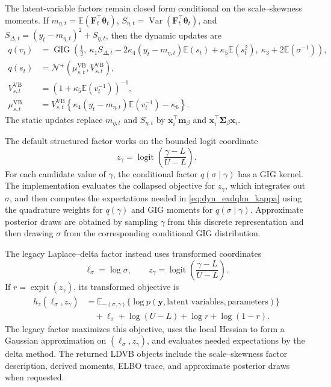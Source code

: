 \documentclass{jss}
\newcommand{\vect}[1]{\boldsymbol{#1}}
\newcommand{\mat}[1]{\mathbf{#1}}
\renewcommand{\E}{\mathbb{E}}
\newcommand{\Var}{\operatorname{Var}}
\newcommand{\logit}{\operatorname{logit}}
\newcommand{\expit}{\operatorname{expit}}
\newcommand{\TNp}{\mathcal{N}^{+}}
\newcommand{\GIG}{\operatorname{GIG}}
\begin{document}
The latent-variable factors remain closed form conditional on the
scale--skewness moments. If $m_{\eta,t}=\E(\mat{F}_t^\top\vect{\theta}_t)$,
$S_{\eta,t}=\Var(\mat{F}_t^\top\vect{\theta}_t)$, and
$S_{\Delta,t}=(y_t-m_{\eta,t})^2+S_{\eta,t}$, then the dynamic updates are
\begin{align}
q(v_t)&=\GIG\left(
\frac{1}{2},\
\kappa_1S_{\Delta,t}-2\kappa_4(y_t-m_{\eta,t})\E(s_t)
+\kappa_5\E(s_t^2),\
\kappa_3+2\E(\sigma^{-1})
\right),\\
q(s_t)&=\TNp(\mu_{s,t}^{\mathrm{VB}},V_{s,t}^{\mathrm{VB}}),\\
V_{s,t}^{\mathrm{VB}}
&=\left(1+\kappa_5\E(v_t^{-1})\right)^{-1},\\
\mu_{s,t}^{\mathrm{VB}}
&=V_{s,t}^{\mathrm{VB}}
\left\{\kappa_4(y_t-m_{\eta,t})\E(v_t^{-1})-\kappa_6\right\}.
\label{eq:dyn_exdqlm_vb_vs}
\end{align}
The static updates replace $m_{\eta,t}$ and $S_{\eta,t}$ by
$\vect{x}_i^\top\vect{m}_\beta$ and
$\vect{x}_i^\top\mat{\Sigma}_\beta\vect{x}_i$.

The default structured factor works on the bounded logit coordinate
\begin{equation}
z_\gamma=\logit\left(\frac{\gamma-L}{U-L}\right).
\label{eq:dyn_exdqlm_ld_transform}
\end{equation}
For each candidate value of \(\gamma\), the conditional factor
\(q(\sigma\mid\gamma)\) has a GIG kernel. The implementation evaluates the
collapsed objective for \(z_\gamma\), which integrates out \(\sigma\), and then
computes the expectations needed in \eqref{eq:dyn_exdqlm_kappa} using the
quadrature weights for \(q(\gamma)\) and GIG moments for
\(q(\sigma\mid\gamma)\). Approximate posterior draws are obtained by sampling
\(\gamma\) from this discrete representation and then drawing \(\sigma\) from
the corresponding conditional GIG distribution.

The legacy Laplace--delta factor instead uses transformed coordinates
\[
\ell_\sigma=\log\sigma,\qquad z_\gamma=
\logit\left(\frac{\gamma-L}{U-L}\right).
\]
If $r=\expit(z_\gamma)$, its transformed objective is
\begin{align}
h_z(\ell_\sigma,z_\gamma)
&=
\E_{-(\sigma,\gamma)}
\{\log p(\vect{y},\text{latent variables},\text{parameters})\}
\nonumber\\
&\quad
+\ell_\sigma+\log(U-L)+\log r+\log(1-r).
\label{eq:dyn_exdqlm_ld_objective}
\end{align}
The legacy factor maximizes this objective, uses the local Hessian to form a
Gaussian approximation on $(\ell_\sigma,z_\gamma)$, and evaluates needed
expectations by the delta method. The returned LDVB objects include the
scale--skewness factor description, derived moments, ELBO trace, and
approximate posterior draws when requested.
\end{document}

